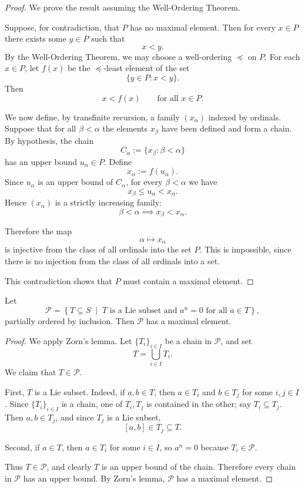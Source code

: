 \begin{proof}
    We prove the result assuming the Well-Ordering Theorem.

    Suppose, for contradiction, that $P$ has no maximal element. Then for every $x\in P$ there exists some $y\in P$ such that
    \[
        x<y.
    \]
    By the Well-Ordering Theorem, we may choose a well-ordering $\preceq$ on $P$. For each $x\in P$, let $f(x)$ be the $\preceq$-least element of the set
    \[
        \{y\in P: x<y\}.
    \]
    Then
    \[
        x<f(x)\qquad \text{for all }x\in P.
    \]

    We now define, by transfinite recursion, a family $(x_\alpha)$ indexed by ordinals. Suppose that for all $\beta<\alpha$ the elements $x_\beta$ have been defined and form a chain. By hypothesis, the chain
    \[
        C_\alpha:=\{x_\beta:\beta<\alpha\}
    \]
    has an upper bound $u_\alpha\in P$. Define
    \[
        x_\alpha:=f(u_\alpha).
    \]
    Since $u_\alpha$ is an upper bound of $C_\alpha$, for every $\beta<\alpha$ we have
    \[
        x_\beta\leq u_\alpha < x_\alpha.
    \]
    Hence $(x_\alpha)$ is a strictly increasing family:
    \[
        \beta<\alpha \implies x_\beta<x_\alpha.
    \]

    Therefore the map
    \[
        \alpha\longmapsto x_\alpha
    \]
    is injective from the class of all ordinals into the set $P$. This is impossible, since there is no injection from the class of all ordinals into a set.

    This contradiction shows that $P$ must contain a maximal element.
\end{proof}

\begin{lemma}
    Let
    \[
        \mathcal P
        =
        \left\{
        T\subseteq S \;\middle|\;
        T \text{ is a Lie subset and } a^n=0 \text{ for all } a\in T
        \right\},
    \]
    partially ordered by inclusion. Then $\mathcal P$ has a maximal element.
\end{lemma}

\begin{proof}
    We apply Zorn's lemma. Let $\{T_i\}_{i\in I}$ be a chain in $\mathcal P$, and set
    \[
        T=\bigcup_{i\in I}T_i.
    \]
    We claim that $T\in\mathcal P$.

    First, $T$ is a Lie subset. Indeed, if $a,b\in T$, then $a\in T_i$ and $b\in T_j$ for some $i,j\in I$. Since $\{T_i\}_{i\in I}$ is a chain, one of $T_i,T_j$ is contained in the other; say $T_i\subseteq T_j$. Then $a,b\in T_j$, and since $T_j$ is a Lie subset,
    \[
        [a,b]\in T_j\subseteq T.
    \]

    Second, if $a\in T$, then $a\in T_i$ for some $i\in I$, so $a^n=0$ because $T_i\in\mathcal P$.

    Thus $T\in\mathcal P$, and clearly $T$ is an upper bound of the chain. Therefore every chain in $\mathcal P$ has an upper bound. By Zorn's lemma, $\mathcal P$ has a maximal element.
\end{proof}

